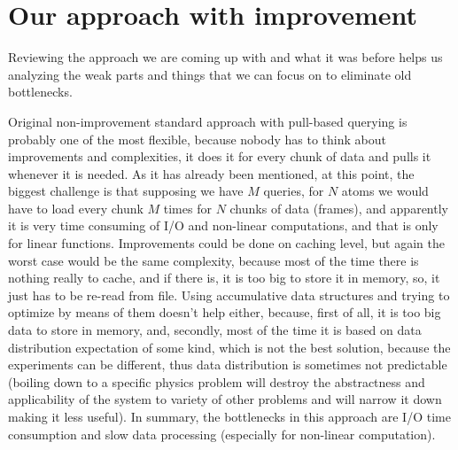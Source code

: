 \documentclass[11pt,a4paper]{report}
\begin{document}
\section{Our approach with improvement}

Reviewing the approach we are coming up with and what it was before helps us analyzing the weak parts and things that we can focus on to eliminate old bottlenecks.

Original non-improvement standard approach with pull-based querying is probably one of the most flexible, because nobody has to think about improvements and complexities, it does it for every chunk of data and pulls it whenever it is needed. As it has already been mentioned, at this point, the biggest challenge is that supposing we have $M$ queries, for $N$ atoms we would have to load every chunk $M$ times for $N$ chunks of data (frames), and apparently it is very time consuming of I/O and non-linear computations, and that is only for linear functions. Improvements could be done on caching level, but again the worst case would be the same complexity, because most of the time there is nothing really to cache, and if there is, it is too big to store it in memory, so, it just has to be re-read from file. Using accumulative data structures and trying to optimize by means of them doesn't help either, because, first of all, it is too big data to store in memory, and, secondly, most of the time it is based on data distribution expectation of some kind, which is not the best solution, because the experiments can be different, thus data distribution is sometimes not predictable (boiling down to a specific physics problem will destroy the abstractness and applicability of the system to variety of other problems and will narrow it down making it less useful). In summary, the bottlenecks in this approach are I/O time consumption and slow data processing (especially for non-linear computation).
\end{document}
